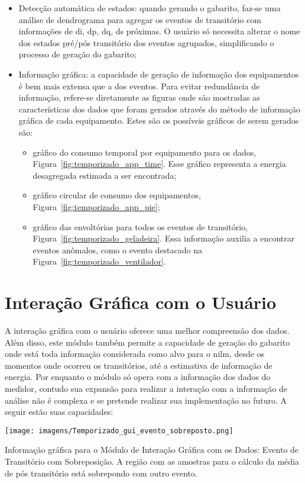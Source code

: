 \begin{itemize}
\item Detecção automática de estados: quando gerando o gabarito,
faz-se uma análise de dendrograma para agregar os eventos de
transitório com informações de \acs{di}, \acs{dp}, \acs{dq}, \acs{ds}
próximas. O usuário só necessita alterar o nome dos estados pré/pós
transitório dos eventos agrupados, simplificando o processo de geração
do gabarito;
\item Informação gráfica: a capacidade de geração de informação dos
equipamentos é bem mais extensa que a dos eventos. Para evitar
redundância de informação, refere-se diretamente as figuras onde são
mostradas as características dos dados que foram gerados através do
método de informação gráfica de cada equipamento. Estes são os possíveis
gráficos de serem gerados são:
\begin{itemize}
\item gráfico do consumo temporal por equipamento para os dados,
Figura~\ref{fig:temporizado_app_time}. Esse gráfico representa a
energia desagregada estimada a ser encontrada;
\item gráfico circular de consumo dos equipamentos,
Figura~\ref{fig:temporizado_app_pie};
\item gráfico das envoltórias para todos os eventos de transitório,
Figura~\ref{fig:temporizado_geladeira}. Essa informação auxilia a
encontrar eventos anômalos, como o evento destacado na
Figura~\ref{fig:temporizado_ventilador}.
\end{itemize}
\end{itemize}

\section{Interação Gráfica com o Usuário}
\label{sec:gui}

A interação gráfica com o usuário oferece uma melhor compreensão dos
dados. Além disso, este módulo também permite a capacidade de geração
do gabarito onde está toda informação considerada como alvo para o
\gls{nilm}, desde os momentos onde ocorreu os transitórios, até a
estimativa de informação de energia. Por enquanto o módulo só opera
com a informação dos dados do medidor, contudo sua expansão para
realizar a interação com a informação de análise não é complexa e
se pretende realizar sua implementação no futuro. A seguir estão
suas capacidades:

\begin{SidewaysFigure}
\centering
\texttt{[image: imagens/Temporizado\_gui\_evento\_sobreposto.png]}
\caption[Informação gráfica para o Módulo de Interação Gráfica com os
Dados: Evento de Transitório com Sobreposição.]{Informação gráfica
para o Módulo de Interação Gráfica com os Dados: Evento de Transitório com
Sobreposição. A região com as amostras para o cálculo da média de pós
transitório está sobrepondo com outro evento.}
\label{fig:gui_evento_sobreposto}
\end{SidewaysFigure}


